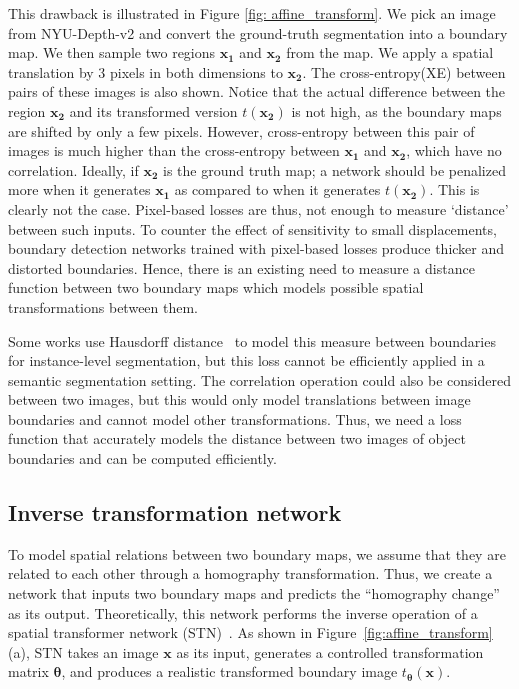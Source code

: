 \documentclass[final]{cvpr}
\begin{document}
This drawback is illustrated in Figure \ref{fig: affine_transform}. We pick an image from NYU-Depth-v2 and convert the ground-truth segmentation into a boundary map. We then sample two regions \(\boldsymbol{x_{1}}\) and \(\boldsymbol{x_{2}}\) from the map. We apply a spatial translation by 3 pixels in both dimensions to \(\boldsymbol{x_{2}}\). The cross-entropy(XE) between pairs of these images is also shown. Notice that the actual difference between the region \(\boldsymbol{x_{2}}\) and its transformed version \(t(\boldsymbol{x_{2}})\) is not high, as the boundary maps are shifted by only a few pixels. However, cross-entropy between this pair of images is much higher than the cross-entropy between \(\boldsymbol{x_{1}}\) and \(\boldsymbol{x_{2}}\), which have no correlation. Ideally, if \(\boldsymbol{x_{2}}\) is the ground truth map; a network should be penalized more when it generates \(\boldsymbol{x_{1}}\) as compared to when it generates \(t(\boldsymbol{x_{2}})\). This is clearly not the case. Pixel-based losses are thus, not enough to measure `distance' between such inputs. To counter the effect of sensitivity to small displacements, boundary detection networks trained with pixel-based losses produce thicker and distorted boundaries. Hence, there is an existing need to measure a distance function between two boundary maps which models possible spatial transformations between them.

Some works use Hausdorff distance~\cite{hausdorff1} to model this measure between boundaries for instance-level segmentation, but this loss cannot be efficiently applied in a semantic segmentation setting. The correlation operation could also be considered between two images, but this would only model translations between image boundaries and cannot model other transformations. Thus, we need a loss function that accurately models the distance between two images of object boundaries and can be computed efficiently.


\subsection{Inverse transformation network}\label{sec:inv_transf_network}

To model spatial relations between two boundary maps, we assume that they are related to each other through a homography transformation. Thus, we create a network that inputs two boundary maps and predicts the ``homography change'' as its output. Theoretically, this network performs the inverse operation of a spatial transformer network (STN)~\cite{spatialtx}. As shown in Figure~\ref{fig:affine_transform}(a), STN takes an image \(\boldsymbol{x}\) as its input, generates a controlled transformation matrix $\boldsymbol{\theta}$, and produces a realistic transformed boundary image \(t_{\boldsymbol{\theta}}(\boldsymbol{x})\). 
\end{document}
